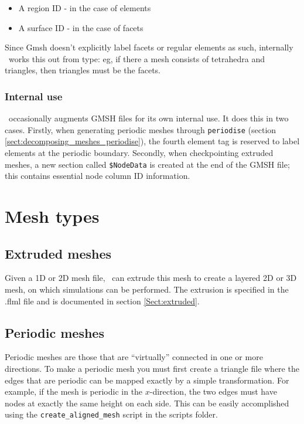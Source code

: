 \begin{itemize}
\item A region ID - in the case of elements
\item A surface ID - in the case of facets
\end{itemize}

Since Gmsh doesn't explicitly label facets or regular elements as such,
internally \fluidity\ works this out from type: eg, if there a mesh consists
of tetrahedra and triangles, then triangles must be the facets.

\subsubsection*{Internal use }
\label{sect:gmsh_internal_use_section}

\fluidity\ occasionally augments GMSH files for its own internal use. It
does this in two cases. Firstly, when generating periodic meshes 
through \lstinline+periodise+ (section \ref{sect:decomposing_meshes_periodise}), the
fourth element tag is reserved to label elements at the periodic boundary.
Secondly, when checkpointing extruded meshes, a new section called
\lstinline+$NodeData+ is created at the end of the GMSH file; this contains
essential node column ID information.
 

\section{Mesh types}
\subsection{Extruded meshes}
\label{sect:extruded_meshes}

Given a 1D or 2D mesh file, \fluidity\ can extrude this
mesh to create a layered 2D or 3D mesh, on which simulations can be
performed. The extrusion is specified in the .flml file and is documented in
section \ref{Sect:extruded}.

\subsection{Periodic meshes}
\label{mesh!mesh types!periodic} 
Periodic meshes are those that are ``virtually'' connected in one or more directions. To make a periodic
mesh you must first create a triangle file where the edges that are periodic
can be mapped exactly by a simple transformation. For example, if the mesh
is periodic in the $x$-direction, the two edges must have nodes at exactly the
same height on each side. This can be easily accomplished using the
\lstinline[language=Bash]+create_aligned_mesh+ script in the scripts folder.

